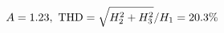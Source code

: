\documentclass[preview]{standalone}
\begin{document}
\begin{align*}
\special{dvisvgm:raw <g id='unique000'>}A=1.23,\ \text{THD}=\sqrt{H_2^2+H_3^2}/H_1=20.3\%\special{dvisvgm:raw </g>}
\end{align*}
\end{document}

